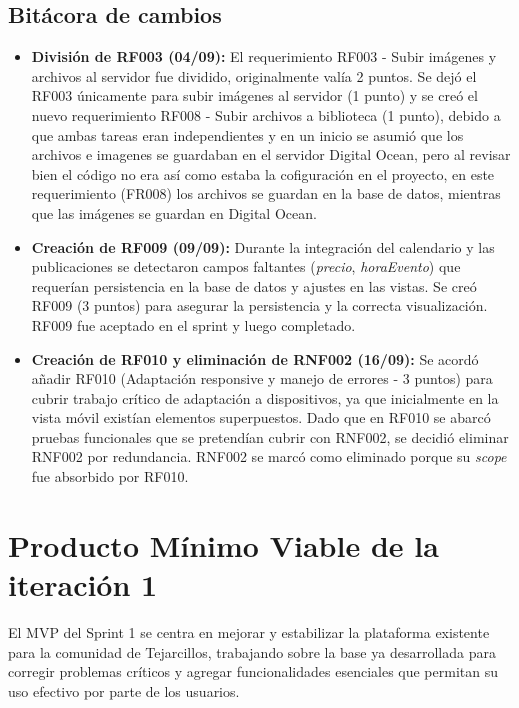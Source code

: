 \subsection{Bitácora de cambios}
\begin{itemize}
    \item \textbf{División de RF003 (04/09):}  
    El requerimiento RF003 - Subir imágenes y archivos al servidor fue dividido, originalmente valía 2 puntos. Se dejó el RF003 únicamente para subir imágenes al servidor (1 punto) y se creó el nuevo requerimiento RF008 - Subir archivos a biblioteca (1 punto), debido a que ambas tareas eran independientes y en un inicio se asumió que los archivos e imagenes se guardaban en el servidor Digital Ocean, pero al revisar bien el código no era así como estaba la cofiguración en el proyecto, en este requerimiento (FR008) los archivos se guardan en la base de datos, mientras que las imágenes se guardan en Digital Ocean.
   
    \item \textbf{Creación de RF009 (09/09):}  
    Durante la integración del calendario y las publicaciones se detectaron campos faltantes (\textit{precio}, \textit{horaEvento}) que requerían persistencia en la base de datos y ajustes en las vistas.  
    Se creó RF009 (3 puntos) para asegurar la persistencia y la correcta visualización. RF009 fue aceptado en el sprint y luego completado.

    \item \textbf{Creación de RF010 y eliminación de RNF002 (16/09):}  
    Se acordó añadir RF010 (Adaptación responsive y manejo de errores - 3 puntos) para cubrir trabajo crítico de adaptación a dispositivos, ya que inicialmente en la vista móvil existían elementos superpuestos.
    Dado que en RF010 se abarcó pruebas funcionales que se pretendían cubrir con RNF002, se decidió eliminar RNF002 por redundancia.
    RNF002 se marcó como eliminado porque su \textit{scope} fue absorbido por RF010.
\end{itemize}

\section{Producto Mínimo Viable de la iteración 1}
El MVP del Sprint 1 se centra en mejorar y estabilizar la plataforma existente para la comunidad de Tejarcillos, trabajando sobre la base ya desarrollada para corregir problemas críticos y agregar funcionalidades esenciales que permitan su uso efectivo por parte de los usuarios.

